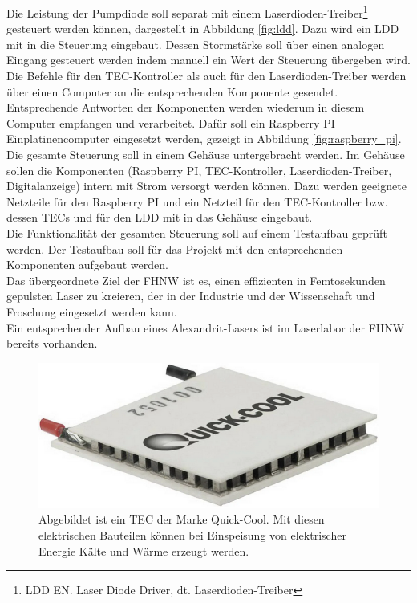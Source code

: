 Die Leistung der Pumpdiode soll separat mit einem Laserdioden-Treiber\footnote{LDD EN. Laser Diode Driver, dt. Laserdioden-Treiber} gesteuert werden können, dargestellt in Abbildung \ref{fig:ldd}. Dazu wird ein LDD mit in die Steuerung eingebaut. Dessen Stormstärke soll über einen analogen Eingang gesteuert werden indem manuell ein Wert der Steuerung übergeben wird.\\
Die Befehle für den TEC-Kontroller als auch für den Laserdioden-Treiber werden über einen Computer an die entsprechenden Komponente gesendet. Entsprechende Antworten der Komponenten werden wiederum in diesem Computer empfangen und verarbeitet. Dafür soll ein Raspberry PI Einplatinencomputer eingesetzt werden, gezeigt in Abbildung \ref{fig:raspberry_pi}.\\

Die gesamte Steuerung soll in einem Gehäuse untergebracht werden. Im Gehäuse sollen die Komponenten  (Raspberry PI, TEC-Kontroller, Laserdioden-Treiber, Digitalanzeige) intern mit Strom versorgt werden können. Dazu werden geeignete Netzteile für den Raspberry PI und ein Netzteil für den TEC-Kontroller bzw. dessen TECs und für den LDD mit in das Gehäuse eingebaut.\\
Die Funktionalität der gesamten Steuerung soll auf einem Testaufbau geprüft werden. Der Testaufbau soll für das Projekt mit den entsprechenden Komponenten aufgebaut werden.\\

Das übergeordnete Ziel der FHNW ist es, einen effizienten in Femtosekunden gepulsten Laser zu kreieren, der in der Industrie und der Wissenschaft und Froschung eingesetzt werden kann.\\
Ein entsprechender Aufbau eines Alexandrit-Lasers ist im Laserlabor der FHNW bereits vorhanden.\\

\begin{figure}[H]
    \centering
    \includegraphics[scale=0.5]{98_images/peltier_modul.PNG}
    \caption{Abgebildet ist ein TEC der Marke Quick-Cool. Mit diesen elektrischen Bauteilen können bei Einspeisung von elektrischer Energie Kälte und Wärme erzeugt werden.}
    \label{fig:peltierelement}
\end{figure}

